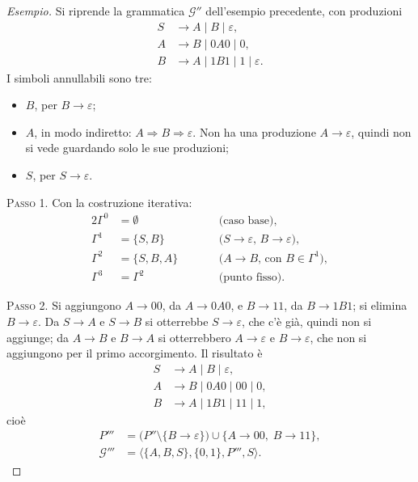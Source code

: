\documentclass[a4paper, 11pt, oneside]{book}
\theoremstyle{formale}
\newenvironment{esempio}
    {\begin{proof}[\textit{Esempio}]\renewcommand{\qedsymbol}{$\diamond$}}
    {\end{proof}}
\begin{document}
    \begin{esempio}
        Si riprende la grammatica $\mathcal{G}''$ dell'esempio precedente, con
        produzioni
        \begin{align*}
            S &\to A \mid B \mid \varepsilon, \\
            A &\to B \mid 0A0 \mid 0, \\
            B &\to A \mid 1B1 \mid 1 \mid \varepsilon.
        \end{align*}
        I simboli annullabili sono tre:
        \begin{itemize}
            \item $B$, per $B \to \varepsilon$;
            \item $A$, in modo indiretto: $A \Rightarrow B \Rightarrow \varepsilon$. Non
                ha una produzione $A \to \varepsilon$, quindi non si vede guardando solo le
                sue produzioni;
            \item $S$, per $S \to \varepsilon$.
        \end{itemize}

        \textsc{Passo 1}. Con la costruzione iterativa:
        \begin{alignat*}{2}
            \Gamma^0 &= \emptyset & \qquad & \text{(caso base)}, \\
            \Gamma^1 &= \{S, B\} & & \text{($S \to \varepsilon$, $B \to \varepsilon$)}, \\
            \Gamma^2 &= \{S, B, A\} & & \text{($A \to B$, con $B \in \Gamma^1$)}, \\
            \Gamma^3 &= \Gamma^2 & & \text{(punto fisso)}.
        \end{alignat*}

        \textsc{Passo 2}. Si aggiungono $A \to 00$, da $A \to 0A0$, e $B \to 11$, da
        $B \to 1B1$; si elimina $B \to \varepsilon$. Da $S \to A$ e $S \to B$ si
        otterrebbe $S \to \varepsilon$, che c'\`e gi\`a, quindi non si aggiunge; da
        $A \to B$ e $B \to A$ si otterrebbero $A \to \varepsilon$ e $B \to \varepsilon$,
        che non si aggiungono per il primo accorgimento. Il risultato \`e
        \begin{align*}
            S &\to A \mid B \mid \varepsilon, \\
            A &\to B \mid 0A0 \mid 00 \mid 0, \\
            B &\to A \mid 1B1 \mid 11 \mid 1,
        \end{align*}
        cio\`e
        \begin{align*}
            P''' &= \bigl(P'' \setminus \{B \to \varepsilon\}\bigr)
                \cup \{A \to 00,\; B \to 11\}, \\
            \mathcal{G}''' &= \langle \{A, B, S\}, \{0, 1\}, P''', S \rangle.
        \end{align*}
    \end{esempio}
\end{document}
